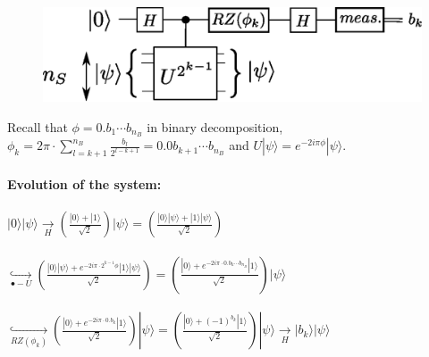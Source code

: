 \documentclass{beamer}
\begin{document}
\begin{frame}
\begin{center}
\begin{figure}
\includegraphics[width=.6\textwidth]{iterative_pea.eps}
\end{figure}
\end{center}
Recall that $\phi=0.b_{1}\cdots b_{n_{B}}$ in binary decomposition,
$\phi_{k}=2\pi\cdot\sum_{l=k+1}^{n_{B}} \frac{b_{l}}{2^{l-k+1}}=0.0b_{k+1}\cdots b_{n_{B}}$
and $U|\psi\rangle=e^{-2i\pi\phi}|\psi\rangle$.\\~\\
\textbf{Evolution of the system:}\\~\\
$|0\rangle|\psi\rangle \underset{H}{\rightarrow} \left(\frac{|0\rangle+|1\rangle}{\sqrt{2}}\right)|\psi\rangle=
\left(\frac{|0\rangle|\psi\rangle+|1\rangle|\psi\rangle}{\sqrt{2}}\right)$\\~\\
$\underset{\bullet-U}{\hookrightarrow}\left(\frac{|0\rangle|\psi\rangle+e^{-2i\pi\cdot 2^{k-1}\phi}|1\rangle|\psi\rangle}{\sqrt{2}}\right)
=\left(\frac{|0\rangle+e^{-2i\pi\cdot 0.b_{k}\cdots b_{n_{B}}}|1\rangle}{\sqrt{2}}\right)|\psi\rangle$\\~\\
$\underset{RZ(\phi_{k})}{\hookrightarrow} \left(\frac{|0\rangle+e^{-2i\pi\cdot 0.b_{k}}|1\rangle}{\sqrt{2}}\right)|\psi\rangle
=\left(\frac{|0\rangle+(-1)^{b_{k}}|1\rangle}{\sqrt{2}}\right)|\psi\rangle
\underset{H}{\rightarrow}|b_{k}\rangle|\psi\rangle$
\end{frame}
\end{document}
